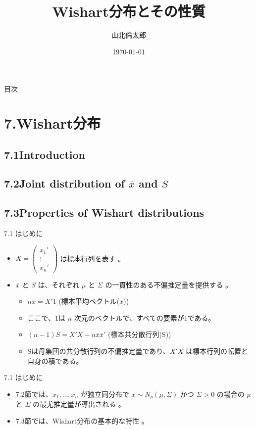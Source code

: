 \documentclass{beamer}
\title{Wishart分布とその性質}
\author{山北倫太郎}
\date{\today}
\begin{document}

\frame{\titlepage}

\begin{frame}{目次}
\tableofcontents
\end{frame}

\section{7.Wishart分布}
\subsection{7.1Introduction}
\subsection{7.2Joint distribution of $\bar{x}$ and $S$}
\subsection{7.3Properties of Wishart distributions}

\begin{frame}{7.1 はじめに}
\begin{itemize}
    \item $X=\begin{pmatrix}x_1' \\ \vdots \\ x_n'\end{pmatrix}$ は標本行列を表す 。
    \item $\bar{x}$ と $S$ は、それぞれ $\mu$ と $\Sigma$ の一貫性のある不偏推定量を提供する 。
    \begin{itemize}
        \item $n\bar{x}=X'1$ (標本平均ベクトル($\bar{x}$))
        \item ここで、1は $n$ 次元のベクトルで、すべての要素が1である。\\
        \item $(n-1)S=X'X-n\bar{x}\bar{x}'$ (標本共分散行列(S))
        \item Sは母集団の共分散行列の不偏推定量であり、$X'X$ は標本行列の転置と自身の積である。
    \end{itemize}

\end{itemize}
\end{frame}
\begin{frame}{7.1 はじめに}
\begin{itemize}
    \item 7.2節では、$x_1, \dots, x_n$ が独立同分布で $x \sim N_p(\mu, \Sigma)$ かつ $\Sigma>0$ の場合の $\mu$ と $\Sigma$ の最尤推定量が導出される 。
    \item 7.3節では、Wishart分布の基本的な特性 。
\end{itemize}
\end{frame}
\end{document}
